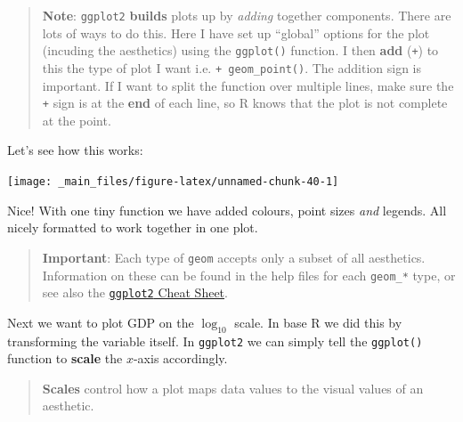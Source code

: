 \documentclass[]{book}
\newenvironment{Shaded}{\begin{snugshade}}{\end{snugshade}}
\newcommand{\KeywordTok}[1]{\textcolor[rgb]{0.13,0.29,0.53}{\textbf{{#1}}}}
\newcommand{\DataTypeTok}[1]{\textcolor[rgb]{0.13,0.29,0.53}{{#1}}}
\newcommand{\DecValTok}[1]{\textcolor[rgb]{0.00,0.00,0.81}{{#1}}}
\newcommand{\StringTok}[1]{\textcolor[rgb]{0.31,0.60,0.02}{{#1}}}
\newcommand{\NormalTok}[1]{{#1}}
\theoremstyle{definition}
\theoremstyle{definition}
\theoremstyle{definition}
\theoremstyle{remark}
\begin{document}
\begin{quote}
\textbf{Note}: \texttt{ggplot2} \textbf{builds} plots up by
\emph{adding} together components. There are lots of ways to do this.
Here I have set up ``global'' options for the plot (incuding the
aesthetics) using the \texttt{ggplot()} function. I then \textbf{add}
(\texttt{+}) to this the type of plot I want i.e.
\texttt{+\ geom\_point()}. The addition sign is important. If I want to
split the function over multiple lines, make sure the \texttt{+} sign is
at the \textbf{end} of each line, so R knows that the plot is not
complete at the point.
\end{quote}

Let's see how this works:

\begin{Shaded}
\end{Shaded}

\begin{center}\texttt{[image: \_main\_files/figure-latex/unnamed-chunk-40-1]} \end{center}

Nice! With one tiny function we have added colours, point sizes
\emph{and} legends. All nicely formatted to work together in one plot.

\begin{quote}
\textbf{Important}: Each type of \texttt{geom} accepts only a subset of
all aesthetics. Information on these can be found in the help files for
each \texttt{geom\_*} type, or see also the
\href{https://www.rstudio.com/wp-content/uploads/2015/03/ggplot2-cheatsheet.pdf}{\texttt{ggplot2}
Cheat Sheet}.
\end{quote}

Next we want to plot GDP on the \(\log_{10}\) scale. In base R we did
this by transforming the variable itself. In \texttt{ggplot2} we can
simply tell the \texttt{ggplot()} function to \textbf{scale} the
\(x\)-axis accordingly.

\begin{quote}
\textbf{Scales} control how a plot maps data values to the visual values
of an aesthetic.
\end{quote}
\end{document}
